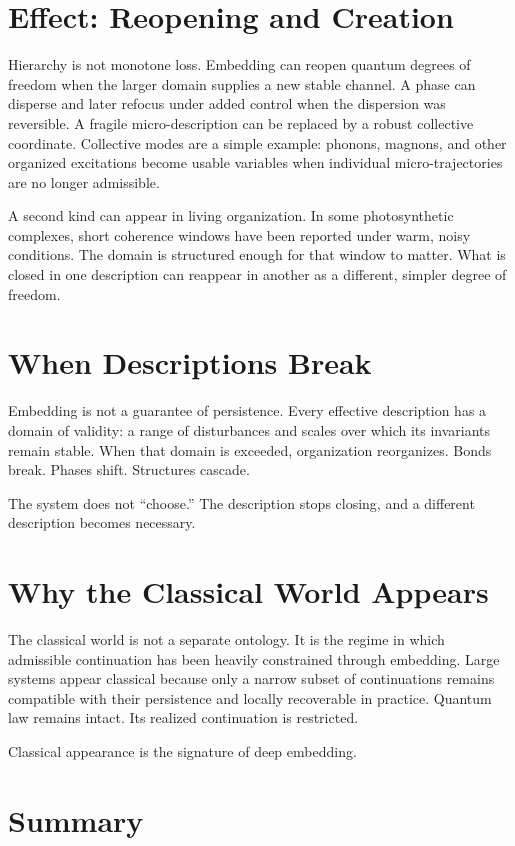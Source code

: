 \documentclass[11pt,twoside,openright]{book}
\begin{document}
\section*{Effect: Reopening and Creation}

Hierarchy is not monotone loss. Embedding can reopen quantum degrees of freedom when the larger domain supplies a new stable channel. A phase can disperse and later refocus under added control when the dispersion was reversible. A fragile micro-description can be replaced by a robust collective coordinate. Collective modes are a simple example: phonons, magnons, and other organized excitations become usable variables when individual micro-trajectories are no longer admissible.

A second kind can appear in living organization. In some photosynthetic complexes, short coherence windows have been reported under warm, noisy conditions. The domain is structured enough for that window to matter. What is closed in one description can reappear in another as a different, simpler degree of freedom.

\section*{When Descriptions Break}

Embedding is not a guarantee of persistence. Every effective description has a domain of validity: a range of disturbances and scales over which its invariants remain stable. When that domain is exceeded, organization reorganizes. Bonds break. Phases shift. Structures cascade.

The system does not ``choose.'' The description stops closing, and a different description becomes necessary.

\section*{Why the Classical World Appears}

The classical world is not a separate ontology. It is the regime in which admissible continuation has been heavily constrained through embedding. Large systems appear classical because only a narrow subset of continuations remains compatible with their persistence and locally recoverable in practice. Quantum law remains intact. Its realized continuation is restricted.

Classical appearance is the signature of deep embedding.

\section*{Summary}
\end{document}
